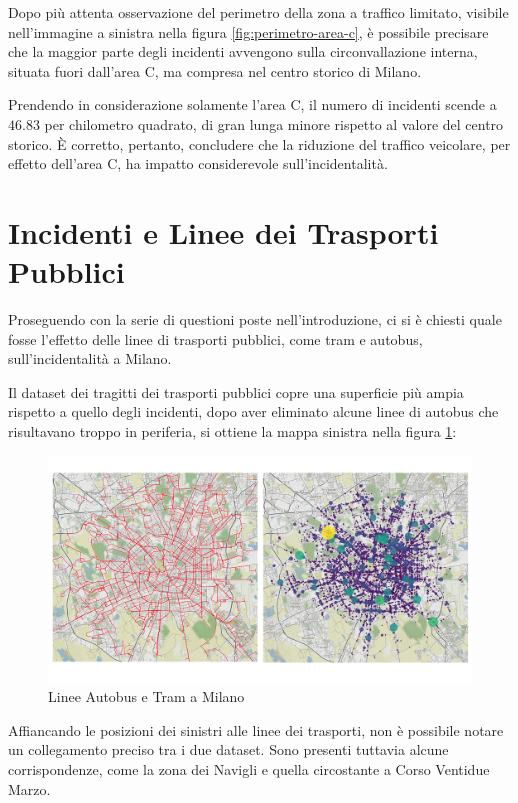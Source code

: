 \documentclass[a4paper,12pt]{report}
\begin{document}
Dopo più attenta osservazione del perimetro della zona a traffico limitato, 
visibile nell'immagine a sinistra nella 
figura \ref{fig:perimetro-area-c}, è possibile precisare che la maggior parte degli 
incidenti avvengono sulla circonvallazione interna, 
situata fuori dall'area C, ma compresa nel centro storico di Milano. 

Prendendo in considerazione solamente l'area C, il numero di incidenti scende a $46.83$ 
per chilometro quadrato, di gran lunga minore rispetto al valore del centro storico. 
\`E corretto, pertanto, concludere che la riduzione del traffico veicolare, per effetto 
dell'area C, ha impatto considerevole sull'incidentalità. 

\section{Incidenti e Linee dei Trasporti Pubblici}

Proseguendo con la serie di questioni poste nell'introduzione, ci si è chiesti quale 
fosse l'effetto delle linee di trasporti pubblici, come tram e autobus, 
sull'incidentalità a Milano. 

Il dataset dei tragitti dei trasporti pubblici copre una superficie più ampia rispetto a 
quello degli incidenti, dopo aver eliminato alcune linee di autobus che risultavano 
troppo in periferia, si ottiene la mappa sinistra nella figura \ref{fig:geo-trasporti}: 

\begin{figure}
    \includegraphics[width=\linewidth]{../src/atm/linee_atm.png}
    \caption{Linee Autobus e Tram a Milano}
    \label{fig:geo-trasporti}
\end{figure}

Affiancando le posizioni dei sinistri alle linee dei trasporti, 
non è possibile notare un collegamento preciso tra i due dataset. 
Sono presenti tuttavia alcune corrispondenze, come la zona dei Navigli 
e quella circostante a Corso Ventidue Marzo. 
\end{document}
